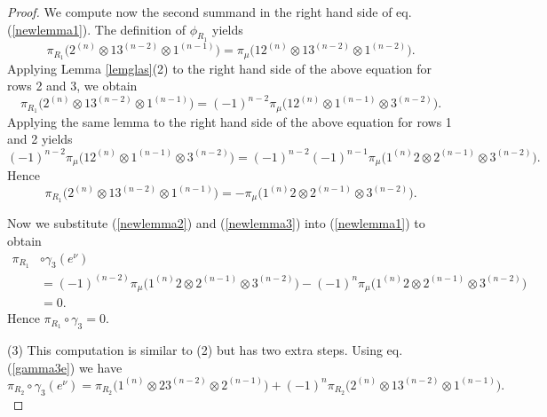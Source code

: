 \documentclass[11pt]{amsart}
\theoremstyle{definition}
\numberwithin{equation}{section}
\begin{document}
\begin{proof}
We compute now the second summand in the right hand side of eq. (\ref{newlemma1}). The definition of $\phi_{R_1}$ yields \[ \pi_{R_1}\big(2^{(n)} \otimes 13^{(n-2)}\otimes1^{(n-1)}\big)=\pi_{\mu}\big(12^{(n)} \otimes 13^{(n-2)}\otimes1^{(n-2)}\big).\]
Applying Lemma \ref{lemglas}(2) to the right hand side of the above equation for rows 2 and 3, we obtain
\[ \pi_{R_1}\big(2^{(n)} \otimes 13^{(n-2)}\otimes1^{(n-1)}\big)=(-1)^{n-2}\pi_{\mu}\big(12^{(n)} \otimes 1^{(n-1)}\otimes3^{(n-2)}\big).\]
Applying the same lemma to the right hand side of the above equation for rows 1 and 2 yields \[(-1)^{n-2}\pi_{\mu}\big(12^{(n)} \otimes 1^{(n-1)}\otimes3^{(n-2)}\big)=(-1)^{n-2}(-1)^{n-1}\pi_{\mu}\big(1^{(n)}2 \otimes 2^{(n-1)}\otimes3^{(n-2)}\big).\] Hence
\begin{equation}\label{newlemma3}
	\pi_{R_1} \big(2^{(n)} \otimes 13^{(n-2)} \otimes 1^{(n-1)}\big)=-\pi_{\mu} \big(1^{(n)}2 \otimes 2^{(n-1)} \otimes 3^{(n-2)}\big).
\end{equation}

Now we substitute (\ref{newlemma2}) and (\ref{newlemma3}) into (\ref{newlemma1}) to obtain
\begin{align*}\pi_{R_1}& \circ \gamma_3 (e^\nu)\\&=(-1)^{(n-2)}\pi_{\mu} \big(1^{(n)}2 \otimes 2^{(n-1)} \otimes 3^{(n-2)}\big) - (-1)^n \pi_{\mu}\big(1^{(n)}2 \otimes 2^{(n-1)} \otimes 3^{(n-2)}\big)\\&=0.\end{align*}
Hence $\pi_{R_1} \circ \gamma_3=0.$

(3) This computation is similar to (2) but has two extra steps. Using eq. (\ref{gamma3e}) we have \begin{equation}\label{newlemma4}\pi_{R_2} \circ \gamma_3 (e^\nu)=\pi_{R_2}\big(1^{(n)} \otimes 23^{(n-2)} \otimes 2^{(n-1)}\big) +(-1)^n \pi_{R_2}\big(2^{(n)} \otimes 13^{(n-2)}\otimes1^{(n-1)}\big).\end{equation}


\end{proof}
\end{document}
